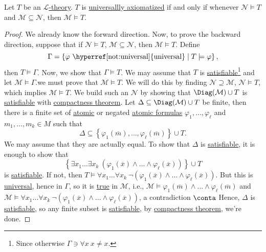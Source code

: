\begin{theorem}
	Let \(T\) be an \hyperref[def:theory]{\(\mathcal{L} \)-theory}. \(T\) is \hyperref[def:universallly-axiomatizable]{universallly axiomatized} if and only if whenever \(\mathcal{N} \models T\) and \(\mathcal{M} \subseteq \mathcal{N} \), then \(\mathcal{M} \models T\).
\end{theorem}
\begin{proof}
	We already know the forward direction. Now, to prove the backward direction, suppose that if \(\mathcal{N} \models T\), \(\mathcal{M} \subseteq \mathcal{N} \), then \(\mathcal{M} \models T\). Define
	\[
		\Gamma = \left\{ \varphi \text{ \hyperref[not:universal]{universal}} \mid T \models \varphi \right\},
	\]
	then \(T \models \Gamma \). Now, we show that \(\Gamma \models T\). We may assume that \(T\) is \hyperref[def:satisfiable]{satisfiable}\footnote{Since otherwise \(\Gamma \ni \forall x\ x \neq x\).} and let \(\mathcal{M} \models \Gamma \).we must prove that \(\mathcal{M} \models T\).  We will do this by finding \(\mathcal{N} \supseteq \mathcal{M} \), \(\mathcal{N} \models T\), which implies \(\mathcal{M} \models T\). We build such an \(\mathcal{N} \) by showing that \(\Diag(\mathcal{M} ) \cup T\) is \hyperref[def:satisfiable]{satisfiable} with \hyperref[thm:compactness]{compactness theorem}. Let \(\Delta \subseteq \Diag(\mathcal{M} ) \cup T\)  be finite, then there is a finite set of \hyperref[not:atomic-formula]{atomic} or negated \hyperref[not:atomic-formula]{atomic formulas} \(\varphi _1, \ldots , \varphi _\ell \) and \(m_1, \ldots , m_k \in M\) such that
	\[
		\Delta \subseteq \left\{ \varphi _1(\overline{m} ), \ldots , \varphi _\ell (\overline{m} ) \right\} \cup T.
	\]
	We may assume that they are actually equal. To show that \(\Delta \) is \hyperref[def:satisfiable]{satisfiable}, it is enough to show that
	\[
		\left\{ \exists x_1 \ldots \exists x_k\ (\varphi _1(\overline{x} ) \land \ldots \land \varphi _\ell (\overline{x} )) \right\} \cup T
	\]
	is \hyperref[def:satisfiable]{satisfiable}. If not, then \(T\models \forall x_1 \ldots \forall x_k\ \lnot (\varphi _1(\overline{x} ) \land \ldots \land \varphi _\ell (\overline{x} ))\). But this is \hyperref[not:universal]{universal}, hence in \(\Gamma \), so it is \hyperref[def:truth]{true} in \(\mathcal{M} \), i.e., \(\mathcal{M} \models \varphi _1(\overline{m} ) \land \ldots \land \varphi _\ell (\overline{m} )\) and \(\mathcal{M} \models \forall x_1 \ldots \forall x_k\ \lnot (\varphi _1(\overline{x} ) \land \ldots \land \varphi _\ell (\overline{x} ))\), a contradiction \(\conta\) Hence, \(\Delta \) is \hyperref[def:satisfiable]{satisfiable}, so any finite subset is \hyperref[def:satisfiable]{satisfiable}, by \hyperref[thm:compactness]{compactness theorem}, we're done.
\end{proof}